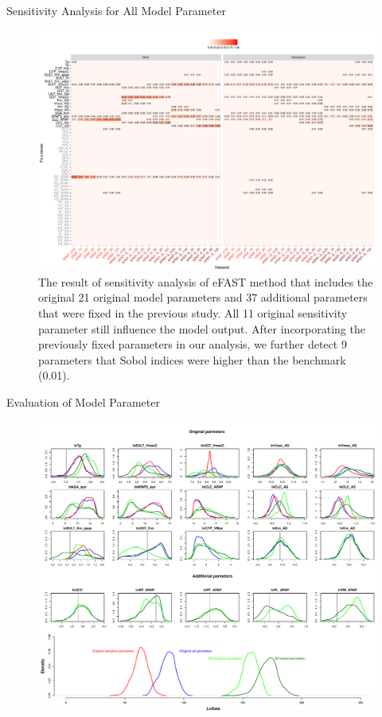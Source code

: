 \documentclass[xcolor=table]{beamer}
\begin{document}
\begin{frame}[t]
\begin{columns}[t]
\begin{column}{0.23\paperwidth} %
%
%
\begin{block}{Sensitivity Analysis for All Model Parameter}
\begin{figure}
\includegraphics[width=0.98\linewidth]{fig5.pdf}
\caption{The result of sensitivity analysis of eFAST method that includes the original 21 original model parameters and 37 additional parameters that were fixed in the previous study. 
All 11 original sensitivity parameter still influence the model output. After incorporating the previously fixed parameters in our analysis, we further detect 9 parameters that Sobol indices were higher than the benchmark (0.01).}
\end{figure}
\end{block}
%
\begin{block}{Evaluation of Model Parameter}
\begin{figure}
\includegraphics[width=0.98\linewidth]{fig6.pdf}

\end{figure}
\end{block}
\end{column}
\end{columns}
\end{frame}
\end{document}
